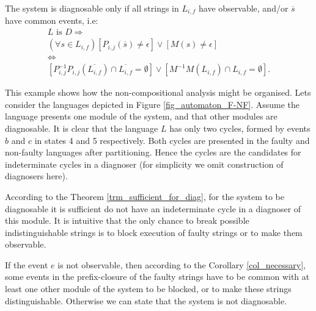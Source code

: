 \documentclass[a4paper,oneside]{article}
\begin{document}
\begin{corollary} The system is
diagnosable only if all strings in $L_{i,f}$ have observable, and/or
$\overline{s}$ have common events, i.e:
\label{col_necessary}
\begin{equation}
\begin{array}{l}
	L \textrm{ is }D \Rightarrow 
	\\[2ex]
	(\forall s \in L_{i,f}) 
	\left[
		P_{i,j}(\overline{s}) \neq \epsilon
	\right]
		\lor 
	\left[
		M(s) \neq \epsilon 
	\right]
	\\[1ex]
	\Leftrightarrow
	\\[1ex]
	\left[
	P^{-1}_{i,j}P_{i,j}(\overline{L_{i,f}})\cap \overline{L_{i,f}} = \emptyset 
	\right]
		\lor
	\left[
		M^{-1}M(L_{i,f})\cap L_{i,f} = \emptyset
	\right]. 
\end{array}
\end{equation}
\end{corollary}

\begin{example} This example shows how the non-compositional analysis might be
organised.
Lets consider the languages depicted in Figure \ref{fig_automaton_F-NF}.
Assume the language presents one module of the system, and that other modules
are diagnosable. It is clear that the language $L$ has only two cycles, formed
by events $b$ and $c$ in states 4 and 5 respectively.
Both cycles are presented in the faulty and non-faulty languages after
partitioning. Hence the cycles are the candidates for indeterminate cycles in a
diagnoser (for simplicity we omit construction of diagnosers here). 

According to the Theorem \ref{trm_sufficient_for_diag}, for the system to be 
diagnosable it is sufficient do not have an indeterminate cycle in a diagnoser
of this module. It is intuitive that the only chance to break
possible indistinguishable strings is to block execution of faulty strings
or to make them observable.

If the event $e$ is not observable, then according to the Corollary
\ref{col_necessary}, some events in the prefix-closure of the faulty strings
have to be common with at least one other module of the system to be blocked, or
to make these strings distinguishable. Otherwise we can state that the system
is not diagnosable.
\end{example}

\end{document}
